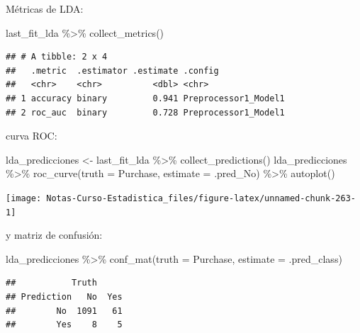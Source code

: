\documentclass[
  12pt,
]{book}
\newenvironment{Shaded}{\begin{snugshade}}{\end{snugshade}}
\newcommand{\AttributeTok}[1]{\textcolor[rgb]{0.77,0.63,0.00}{#1}}
\newcommand{\FunctionTok}[1]{\textcolor[rgb]{0.00,0.00,0.00}{#1}}
\newcommand{\NormalTok}[1]{#1}
\newcommand{\OtherTok}[1]{\textcolor[rgb]{0.56,0.35,0.01}{#1}}
\newcommand{\SpecialCharTok}[1]{\textcolor[rgb]{0.00,0.00,0.00}{#1}}
\begin{document}
Métricas de LDA:

\begin{Shaded}
\begin{Highlighting}[]
\NormalTok{last\_fit\_lda }\SpecialCharTok{\%\textgreater{}\%}
    \FunctionTok{collect\_metrics}\NormalTok{()}
\end{Highlighting}
\end{Shaded}

\begin{verbatim}
## # A tibble: 2 x 4
##   .metric  .estimator .estimate .config             
##   <chr>    <chr>          <dbl> <chr>               
## 1 accuracy binary         0.941 Preprocessor1_Model1
## 2 roc_auc  binary         0.728 Preprocessor1_Model1
\end{verbatim}

curva ROC:

\begin{Shaded}
\begin{Highlighting}[]
\NormalTok{lda\_predicciones }\OtherTok{\textless{}{-}}\NormalTok{ last\_fit\_lda }\SpecialCharTok{\%\textgreater{}\%}
    \FunctionTok{collect\_predictions}\NormalTok{()}
\NormalTok{lda\_predicciones }\SpecialCharTok{\%\textgreater{}\%}
    \FunctionTok{roc\_curve}\NormalTok{(}\AttributeTok{truth =}\NormalTok{ Purchase, }\AttributeTok{estimate =}\NormalTok{ .pred\_No) }\SpecialCharTok{\%\textgreater{}\%}
    \FunctionTok{autoplot}\NormalTok{()}
\end{Highlighting}
\end{Shaded}

\begin{center}\texttt{[image: Notas-Curso-Estadistica\_files/figure-latex/unnamed-chunk-263-1]} \end{center}

y matriz de confusión:

\begin{Shaded}
\begin{Highlighting}[]
\NormalTok{lda\_predicciones }\SpecialCharTok{\%\textgreater{}\%}
    \FunctionTok{conf\_mat}\NormalTok{(}\AttributeTok{truth =}\NormalTok{ Purchase, }\AttributeTok{estimate =}\NormalTok{ .pred\_class)}
\end{Highlighting}
\end{Shaded}

\begin{verbatim}
##           Truth
## Prediction   No  Yes
##        No  1091   61
##        Yes    8    5
\end{verbatim}
\end{document}
